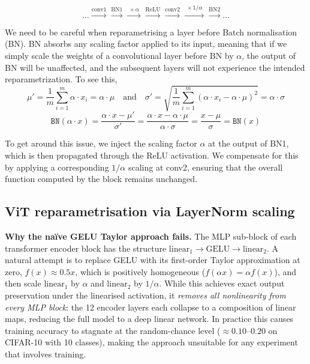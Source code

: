 \documentclass{article}
\begin{document}
\[
  \hdots 
  \xrightarrow{\text{conv1}} 
  \xrightarrow{\text{BN1}} 
  \xrightarrow{\;\times\alpha\;} 
  \xrightarrow{\text{ReLU}} 
  \xrightarrow{\text{conv2}} 
  \xrightarrow{\;\times 1/\alpha\;} 
  \xrightarrow{\text{BN2}} 
  \hdots
\]

We need to be careful when reparametrising a layer before Batch normalisation (BN). BN absorbs any scaling factor applied to its input, meaning that if we simply scale the weights of a convolutional layer before BN by $\alpha$, the output of BN will be unaffected, and the subsequent layers will not experience the intended reparametrization. To see this, 
\[
  \mu' = \frac{1}{m} \sum_{i=1}^m \alpha \cdot x_i = \alpha \cdot \mu \quad \text{and} \quad
  \sigma' = \sqrt{\frac{1}{m} \sum_{i=1}^m (\alpha \cdot x_i - \alpha \cdot \mu)^2} = \alpha \cdot \sigma
\]
\[
  \texttt{BN}(\alpha \cdot x) = \frac{\alpha \cdot x - \mu'}{\sigma'} = \frac{\alpha \cdot x - \alpha \cdot \mu}{\alpha \cdot \sigma} = \frac{x - \mu}{\sigma} = \texttt{BN}(x)
\]

To get around this issue, we inject the scaling factor $\alpha$ at the output of BN1, which is then propagated through the ReLU activation. We compensate for this by applying a corresponding $1/\alpha$ scaling at conv2, ensuring that the overall function computed by the block remains unchanged.

\label{appendix:layernorm_reparam}
\subsection{ViT reparametrisation via LayerNorm scaling}

\textbf{Why the na\"ive GELU Taylor approach fails.}
The MLP sub-block of each transformer encoder block has the structure
$\text{linear}_1 \to \text{GELU} \to \text{linear}_2$.
A natural attempt is to replace GELU with its first-order Taylor approximation at zero,
$f(x)\approx 0.5x$, which is positively homogeneous ($f(\alpha x)=\alpha f(x)$), and then scale
$\text{linear}_1$ by $\alpha$ and $\text{linear}_2$ by $1/\alpha$.
While this achieves exact output preservation under the linearised activation, it
\emph{removes all nonlinearity from every MLP block}: the 12 encoder layers each
collapse to a composition of linear maps, reducing the full model to a deep linear
network. In practice this causes training accuracy to stagnate at the random-chance
level ($\approx 0.10$--$0.20$ on CIFAR-10 with 10 classes), making the approach
unsuitable for any experiment that involves training.
\end{document}
